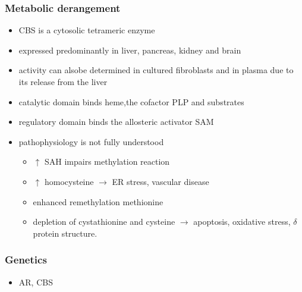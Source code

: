 \documentclass{scrartcl}
\begin{document}
\subsubsection{Metabolic derangement}
\label{sec:org3f65aa5}
\begin{itemize}
\item CBS is a cytosolic tetrameric enzyme
\item expressed predominantly in liver, pancreas, kidney and brain
\item activity can alsobe determined in cultured fibroblasts and in plasma
due to its release from the liver
\item catalytic domain binds heme,the cofactor PLP and substrates
\item regulatory domain binds the allosteric activator SAM
\item pathophysiology is not fully understood
\begin{itemize}
\item \(\uparrow\) SAH impairs methylation reaction
\item \(\uparrow\) homocysteine \(\to\) ER stress, vascular disease
\item enhanced remethylation methionine
\item depletion of cystathionine and cysteine \(\to\) apoptosis, oxidative stress, \(\delta\) protein structure.
\end{itemize}
\end{itemize}

\subsubsection{Genetics}
\label{sec:org6957f92}
\begin{itemize}
\item AR, CBS
\end{itemize}
\end{document}
